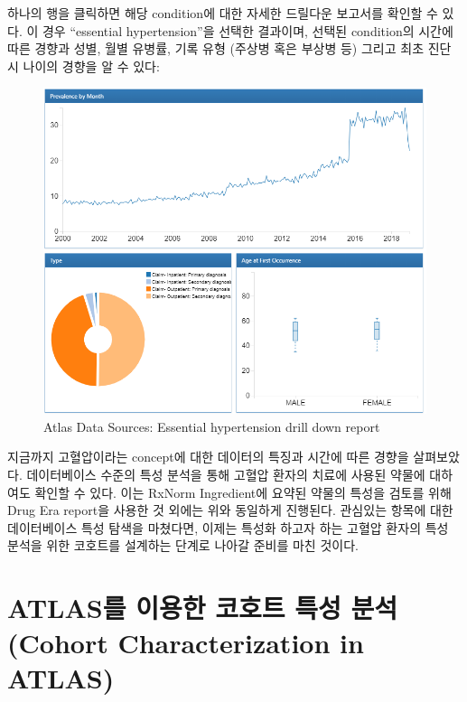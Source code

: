 \documentclass[11pt]{book}
\theoremstyle{definition}
\theoremstyle{definition}
\theoremstyle{definition}
\theoremstyle{remark}
\begin{document}
하나의 행을 클릭하면 해당 condition에 대한 자세한 드릴다운 보고서를
확인할 수 있다. 이 경우 ``essential hypertension''을 선택한 결과이며,
선택된 condition의 시간에 따른 경향과 성별, 월별 유병률, 기록 유형
(주상병 혹은 부상병 등) 그리고 최초 진단 시 나이의 경향을 알 수 있다:

\begin{figure}

{\centering \includegraphics[width=1\linewidth]{images/Characterization/atlasDataSourcesDrillDownReport} 

}

\caption{Atlas Data Sources: Essential hypertension drill down report}\label{fig:atlasDataSourcesDrillDownReport}
\end{figure}

지금까지 고혈압이라는 concept에 대한 데이터의 특징과 시간에 따른 경향을
살펴보았다. 데이터베이스 수준의 특성 분석을 통해 고혈압 환자의 치료에
사용된 약물에 대하여도 확인할 수 있다. 이는 RxNorm Ingredient에 요약된
약물의 특성을 검토를 위해 Drug Era report을 사용한 것 외에는 위와
동일하게 진행된다. 관심있는 항목에 대한 데이터베이스 특성 탐색을
마쳤다면, 이제는 특성화 하고자 하는 고혈압 환자의 특성 분석을 위한
코호트를 설계하는 단계로 나아갈 준비를 마친 것이다.

\section{ATLAS를 이용한 코호트 특성 분석 (Cohort Characterization in
ATLAS)}\label{atlas-----cohort-characterization-in-atlas}
\end{document}
